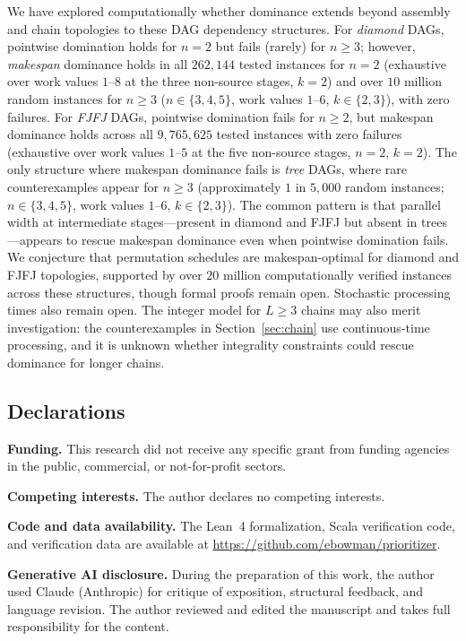\documentclass[11pt,titlepage]{article}
\begin{document}
We have explored computationally whether dominance
extends beyond assembly and chain topologies to these DAG
dependency structures. For \emph{diamond} DAGs,
pointwise domination holds for
$n = 2$ but fails (rarely) for $n \geq 3$; however,
\emph{makespan} dominance holds in all $262{,}144$ tested
instances for $n = 2$ (exhaustive over work values $1$--$8$
at the three non-source stages, $k = 2$)
and over $10$ million random instances for
$n \geq 3$ ($n \in \{3,4,5\}$, work values $1$--$6$,
$k \in \{2,3\}$), with zero failures. For
\emph{FJFJ} DAGs,
pointwise domination
fails for $n \geq 2$, but makespan dominance holds across
all $9{,}765{,}625$ tested instances with zero failures
(exhaustive over work values $1$--$5$ at the five
non-source stages, $n = 2$, $k = 2$).
The only structure where makespan dominance fails is
\emph{tree} DAGs, where
rare counterexamples appear for $n \geq 3$ (approximately
$1$ in $5{,}000$ random instances; $n \in \{3,4,5\}$,
work values $1$--$6$, $k \in \{2,3\}$).
The common pattern is that
parallel width at intermediate stages---present in diamond
and FJFJ but absent in trees---appears to rescue makespan
dominance even when pointwise domination fails. We
conjecture that permutation schedules are makespan-optimal
for diamond and FJFJ topologies, supported by over $20$
million computationally verified instances across these
structures, though formal proofs remain open.
Stochastic processing times also remain open. The integer
model for $L \geq 3$ chains may also merit investigation:
the counterexamples in Section~\ref{sec:chain} use
continuous-time processing, and it is unknown whether
integrality constraints could rescue dominance for longer
chains.


\subsection*{Declarations}

\textbf{Funding.}
This research did not receive any specific grant from funding
agencies in the public, commercial, or not-for-profit sectors.

\textbf{Competing interests.}
The author declares no competing interests.

\textbf{Code and data availability.}
The Lean~4 formalization, Scala verification code, and
verification data are available at
\url{https://github.com/ebowman/prioritizer}.

\textbf{Generative AI disclosure.}
During the preparation of this work, the author used Claude
(Anthropic) for critique of exposition, structural feedback,
and language revision. The author reviewed and edited the manuscript and
takes full responsibility for the content.
\end{document}
